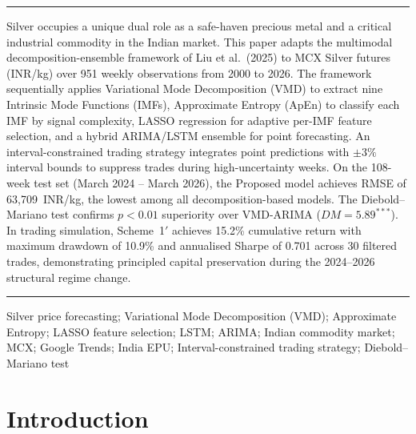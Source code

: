 \documentclass[12pt,a4paper]{article}
\begin{document}
\vspace{6pt}\noindent\rule{\linewidth}{0.4pt}

\vspace{4pt}\vspace{3pt}

\noindent
Silver occupies a unique dual role as a safe-haven precious metal and a critical
industrial commodity in the Indian market. This paper adapts the multimodal
decomposition-ensemble framework of Liu et al.\ (2025) to MCX Silver futures (INR/kg)
over 951 weekly observations from 2000 to 2026. The framework sequentially applies
Variational Mode Decomposition (VMD) to extract nine Intrinsic Mode Functions (IMFs),
Approximate Entropy (ApEn) to classify each IMF by signal complexity, LASSO regression
for adaptive per-IMF feature selection, and a hybrid ARIMA/LSTM ensemble for point
forecasting. An interval-constrained trading strategy integrates point predictions with
$\pm3\%$ interval bounds to suppress trades during high-uncertainty weeks. On the
108-week test set (March 2024 -- March 2026), the Proposed model achieves RMSE of
63,709~INR/kg, the lowest among all decomposition-based models. The Diebold--Mariano
test confirms $p<0.01$ superiority over VMD-ARIMA ($DM=5.89^{***}$). In trading
simulation, Scheme~1$'$ achieves 15.2\% cumulative return with maximum drawdown of
10.9\% and annualised Sharpe of 0.701 across 30 filtered trades, demonstrating
principled capital preservation during the 2024--2026 structural regime change.

\vspace{5pt}\noindent\rule{\linewidth}{0.4pt}

\vspace{4pt}\vspace{3pt}

\noindent
Silver price forecasting; Variational Mode Decomposition (VMD); Approximate Entropy;
LASSO feature selection; LSTM; ARIMA; Indian commodity market; MCX; Google Trends;
India EPU; Interval-constrained trading strategy; Diebold--Mariano test

\newpage

\section{Introduction}
\end{document}
